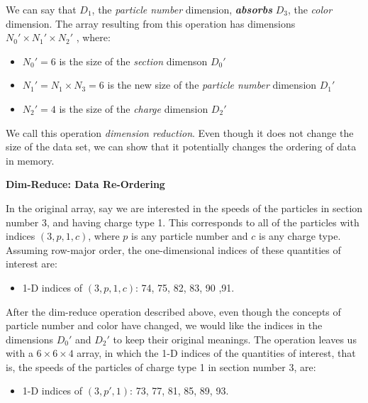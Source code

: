 \documentclass[conference]{IEEEtran}
\newcommand{\subsubsubsection}{\noindent\textbf}
\begin{document}
We can say that $D_1$, the {\em particle number} dimension, \textbf{\em
absorbs} $D_3$, the {\em color} dimension. The array resulting from this
operation has dimensions $N_0'{\times}N_1'{\times}N_2'$ , where:

\begin{itemize}

\item $N_0' = 6$ is the size of the {\em section} dimenson $D_0'$

\item $N_1' = N_1{\times}N_3 = 6$ is the new size of the {\em particle number} dimension $D_1'$

\item $N_2' = 4$ is the size of the {\em charge} dimension $D_2'$

\end{itemize}

We call this operation {\em dimension reduction}. Even though it does not
change the size of the data set, we can show that it potentially changes the
ordering of data in memory.

\subsubsubsection{Dim-Reduce: Data Re-Ordering}

In the original array, say we are interested in the speeds of the particles in
section number 3, and having charge type 1. This corresponds to all of the
particles with indices $(3, p, 1, c)$, where $p$ is any particle number and $c$
is any charge type. Assuming row-major order, the one-dimensional indices of
these quantities of interest are:

\begin{itemize}

\item 1-D indices of $(3, p, 1, c)$: 74, 75, 82, 83, 90 ,91.

\end{itemize}

After the dim-reduce operation described above, even though the concepts of
particle number and color have changed, we would like the indices in the
dimensions $D_0'$ and $D_2'$ to keep their original meanings. The operation
leaves us with a $6{\times}6{\times}4$ array, in which the 1-D indices of the
quantities of interest, that is, the speeds of the particles of charge type 1
in section number 3, are:

\begin{itemize}

\item 1-D indices of $(3, p' , 1)$: 73, 77, 81, 85, 89, 93.

\end{itemize}
\end{document}
